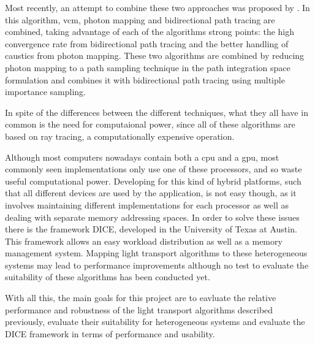 Most recently, an attempt to combine these two approaches was proposed by \cite{Georgiev}. In this algorithm, \gls{vcm}, photon mapping and bidirectional path tracing are combined, taking advantage of each of the algorithms strong points: the high convergence rate from bidirectional path tracing and the better handling of caustics from photon mapping. These two algorithms are combined by reducing photon mapping to a path sampling technique in the path integration space formulation and combines it with bidirectional path tracing using multiple importance sampling.

In spite of the differences between the different techniques, what they all have in common is the need for computaional power, since all of these algorithms are based on ray tracing, a computationally expensive operation.

Although most computers nowadays contain both a \gls{cpu} and a \gls{gpu}, most commonly seen implementations only use one of these processors, and so waste useful computational power. Developing for this kind of hybrid platforms, such that all different devices are used by the application, is not easy though, as it involves maintaining different implementations for each processor as well as dealing with separate memory addressing spaces. In order to solve these issues there is the framework DICE, developed in the University of Texas at Austin. This framework allows an easy workload distribution as well as a memory management system. Mapping light transport algorithms to these heterogeneous systems may lead to performance improvements although no test to evaluate the suitability of these algorithms has been conducted yet. 

With all this, the main goals for this project are to eavluate the relative performance and robustness of the light transport algorithms described previously, evaluate their suitability for heterogeneous systems and evaluate the DICE framework in terms of performance and usability.